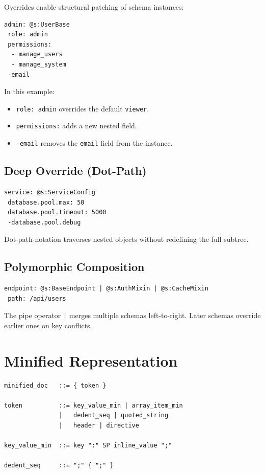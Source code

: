 \documentclass[11pt, a4paper]{article}
\begin{document}
\noindent Overrides enable structural patching of schema instances:

\begin{lstlisting}[style=scon]
admin: @s:UserBase
 role: admin
 permissions:
  - manage_users
  - manage_system
 -email
\end{lstlisting}

\noindent In this example:
\begin{itemize}
\item \texttt{role: admin} overrides the default \texttt{viewer}.
\item \texttt{permissions:} adds a new nested field.
\item \texttt{-email} removes the \texttt{email} field from the instance.
\end{itemize}

\subsection{Deep Override (Dot-Path)}

\begin{lstlisting}[style=scon]
service: @s:ServiceConfig
 database.pool.max: 50
 database.pool.timeout: 5000
 -database.pool.debug
\end{lstlisting}

\noindent Dot-path notation traverses nested objects without redefining the
full subtree.

\subsection{Polymorphic Composition}

\begin{lstlisting}[style=scon]
endpoint: @s:BaseEndpoint | @s:AuthMixin | @s:CacheMixin
 path: /api/users
\end{lstlisting}

\noindent The pipe operator \texttt{|} merges multiple schemas left-to-right.
Later schemas override earlier ones on key conflicts.

\section{Minified Representation}
\label{sec:minification}

\begin{lstlisting}[style=ebnf]
minified_doc   ::= { token }

token          ::= key_value_min | array_item_min
               |   dedent_seq | quoted_string
               |   header | directive

key_value_min  ::= key ":" SP inline_value ";"

dedent_seq     ::= ";" { ";" }
\end{lstlisting}
\end{document}
